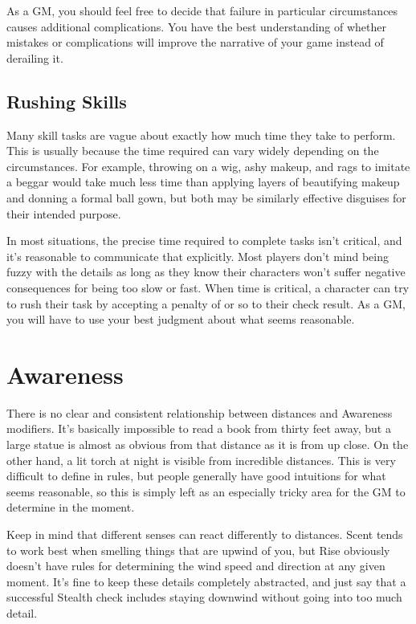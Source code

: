     As a GM, you should feel free to decide that failure in particular circumstances causes additional complications.
    You have the best understanding of whether mistakes or complications will improve the narrative of your game instead of derailing it.

  \subsection{Rushing Skills}
    Many skill tasks are vague about exactly how much time they take to perform.
    This is usually because the time required can vary widely depending on the circumstances.
    For example, throwing on a wig, ashy makeup, and rags to imitate a beggar would take much less time than applying layers of beautifying makeup and donning a formal ball gown, but both may be similarly effective disguises for their intended purpose.

    In most situations, the precise time required to complete tasks isn't critical, and it's reasonable to communicate that explicitly.
    Most players don't mind being fuzzy with the details as long as they know their characters won't suffer negative consequences for being too slow or fast.
    When time is critical, a character can try to rush their task by accepting a penalty of  or so to their check result.
    As a GM, you will have to use your best judgment about what seems reasonable.

\section{Awareness}
  There is no clear and consistent relationship between distances and Awareness modifiers.
  It's basically impossible to read a book from thirty feet away, but a large statue is almost as obvious from that distance as it is from up close.
  On the other hand, a lit torch at night is visible from incredible distances.
  This is very difficult to define in rules, but people generally have good intuitions for what seems reasonable, so this is simply left as an especially tricky area for the GM to determine in the moment.

  Keep in mind that different senses can react differently to distances.
  Scent tends to work best when smelling things that are upwind of you, but Rise obviously doesn't have rules for determining the wind speed and direction at any given moment.
  It's fine to keep these details completely abstracted, and just say that a successful Stealth check includes staying downwind without going into too much detail.

